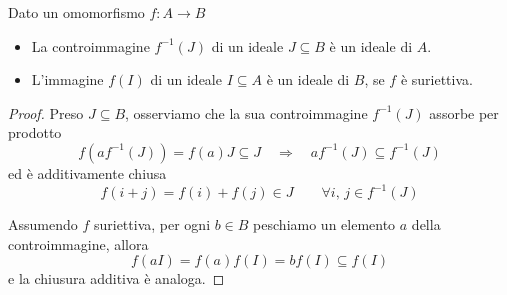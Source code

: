 \begin{multicols}{2}
\begin{prop}\label{immideali}
	Dato un omomorfismo $ f : A \to B $
	\begin{itemize}
		\item La controimmagine $ f^{-1}(J) $ di un ideale $ J \subseteq B $ è un ideale di $ A $.
		\item L'immagine $ f(I) $ di un ideale $ I \subseteq A $ è un ideale di $ B $, se $ f $ è suriettiva.
	\end{itemize}
\end{prop}
\begin{proof}
	Preso $ J \subseteq B $, osserviamo che la sua controimmagine $ f^{-1}(J) $ assorbe per prodotto
	\[ f(af^{-1}(J)) = f(a)J \subseteq J \quad\Rightarrow\quad af^{-1}(J) \subseteq f^{-1}(J)  \]
	ed è additivamente chiusa
	\[ f(i + j) = f(i) + f(j) \in J \qquad \forall i, \, j \in f^{-1}(J) \]
	
	Assumendo $ f $ suriettiva, per ogni $ b \in B $ peschiamo un elemento $ a $ della controimmagine, allora
	\[ f(aI) = f(a)f(I) = bf(I) \subseteq f(I) \]
	e la chiusura additiva è analoga.
\end{proof}


\end{multicols}
